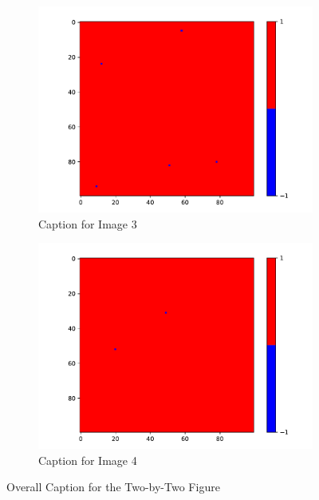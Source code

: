 \begin{figure}
    \vspace{0.5cm}
    
    \begin{subfigure}{0.45\textwidth}
      \centering
      \includegraphics[width=\linewidth]{images/Ising1_3.pdf}
      \caption{Caption for Image 3}
      \label{fig:image3}
    \end{subfigure}
    \hfill
    \begin{subfigure}{0.45\textwidth}
      \centering
      \includegraphics[width=\linewidth]{images/Ising1_4.pdf}
      \caption{Caption for Image 4}
      \label{fig:image4}
    \end{subfigure}
    \caption{Overall Caption for the Two-by-Two Figure}
    \label{fig:two_by_two}
  \end{figure}

